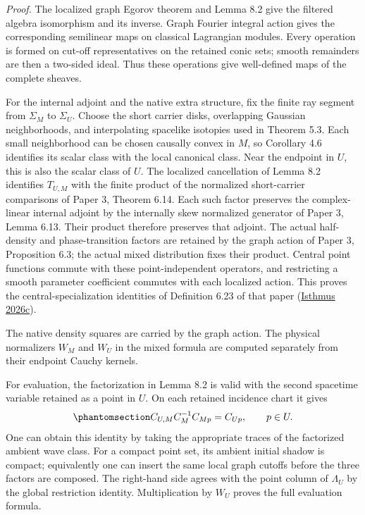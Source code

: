\documentclass[
  english,
  11pt,
  reqno]{amsart}
\begin{document}
\emph{Proof.} The localized graph Egorov theorem and Lemma 8.2 give the
filtered algebra isomorphism and its inverse. Graph Fourier integral
action gives the corresponding semilinear maps on classical Lagrangian
modules. Every operation is formed on cut-off representatives on the
retained conic sets; smooth remainders are then a two-sided ideal. Thus
these operations give well-defined maps of the complete sheaves.

For the internal adjoint and the native extra structure, fix the finite
ray segment from \(\Sigma_M\) to \(\Sigma_U\). Choose the short carrier
disks, overlapping Gaussian neighborhoods, and interpolating spacelike
isotopies used in Theorem 5.3. Each small neighborhood can be chosen
causally convex in \(M\), so Corollary 4.6 identifies its scalar class
with the local canonical class. Near the endpoint in \(U\), this is also
the scalar class of \(U\). The localized cancellation of Lemma 8.2
identifies \(T_{U,M}\) with the finite product of the normalized
short-carrier comparisons of Paper 3, Theorem 6.14. Each such factor
preserves the complex-linear internal adjoint by the internally skew
normalized generator of Paper 3, Lemma 6.13. Their product therefore
preserves that adjoint. The actual half-density and phase-transition
factors are retained by the graph action of Paper 3, Proposition 6.3;
the actual mixed distribution fixes their product. Central point
functions commute with these point-independent operators, and
restricting a smooth parameter coefficient commutes with each localized
action. This proves the central-specialization identities of Definition
6.23 of that paper (\hyperref[ref-IsthmusSmooth2026]{Isthmus 2026c}).

The native density squares are carried by the graph action. The physical
normalizers \(W_M\) and \(W_U\) in the mixed formula are computed
separately from their endpoint Cauchy kernels.

For evaluation, the factorization in Lemma 8.2 is valid with the second
spacetime variable retained as a point in \(U\). On each retained
incidence chart it gives
\begin{equation}\protect\phantomsection\label{eq:relative-point-factorization}{
C_{U,M}C_M^{-1}C_{Mp}=C_{Up},
\qquad p\in U.
}\end{equation} One can obtain this identity by taking the appropriate
traces of the factorized ambient wave class. For a compact point set,
its ambient initial shadow is compact; equivalently one can insert the
same local graph cutoffs before the three factors are composed. The
right-hand side agrees with the point column of \(\Lambda_U\) by the
global restriction identity. Multiplication by \(W_U\) proves the full
evaluation formula.
\end{document}
